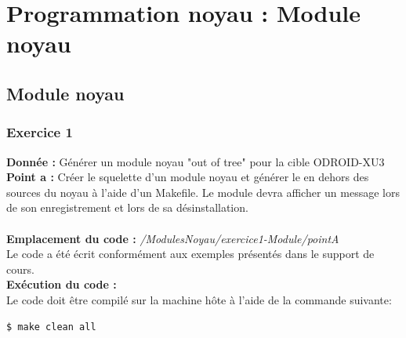\section{Programmation noyau : Module noyau}
\subsection{Module noyau}
\subsubsection{Exercice 1}
\textbf{Donnée : } Générer un module noyau "out of tree" pour la cible ODROID-XU3\\
\textbf{Point a :} Créer	le	squelette	d’un	module	noyau	et	générer	le	en	dehors	des	sources	du	noyau	à	l’aide	d’un	Makefile.	Le	module	devra	afficher	un	message	lors	de	son	enregistrement	et	lors	de	sa	désinstallation.\\\\
\textbf{Emplacement du code : } \textit{/ModulesNoyau/exercice1-Module/pointA}\\
Le code a été écrit conformément aux exemples présentés dans le support de cours.\\

\textbf{Exécution du code : } \\
Le code doit être compilé sur la machine hôte à l'aide de la commande suivante:
\begin{lstlisting}
$ make clean all
\end{lstlisting}

